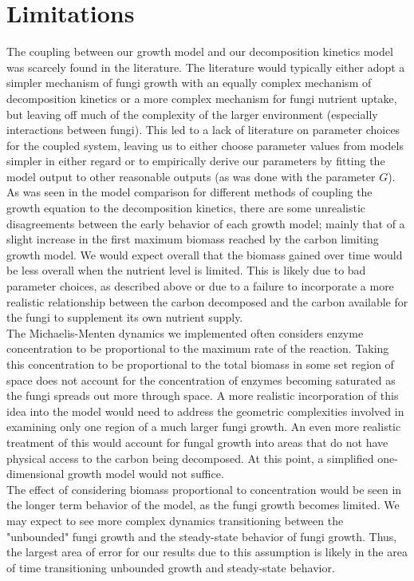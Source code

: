 \documentclass[10pt]{article}
\begin{document}
\section*{Limitations}
The coupling between our growth model and our decomposition kinetics model was scarcely found in the literature. The literature would typically either adopt a simpler mechanism of fungi growth with an equally complex mechanism of decomposition kinetics or a more complex mechanism for fungi nutrient uptake, but leaving off much of the complexity of the larger environment (especially interactions between fungi). This led to a lack of literature on parameter choices for the coupled system, leaving us to either choose parameter values from models simpler in either regard or to empirically derive our parameters by fitting the model output to other reasonable outputs (as was done with the parameter $G$). As was seen in the model comparison for different methods of coupling the growth equation to the decomposition kinetics, there are some unrealistic disagreements between the early behavior of each growth model; mainly that of a slight increase in the first maximum biomass reached by the carbon limiting growth model. We would expect overall that the biomass gained over time would be less overall when the nutrient level is limited. This is likely due to bad parameter choices, as described above or due to a failure to incorporate a more realistic relationship between the carbon decomposed and the carbon available for the fungi to supplement its own nutrient supply. \\
The Michaelis-Menten dynamics we implemented often considers enzyme concentration to be proportional to the maximum rate of the reaction. Taking this concentration to be proportional to the total biomass in some set region of space does not account for the concentration of enzymes becoming saturated as the fungi spreads out more through space. A more realistic incorporation of this idea into the model would need to address the geometric complexities involved in examining only one region of a much larger fungi growth. An even more realistic treatment of this would account for fungal growth into areas that do not have physical access to the carbon being decomposed. At this point, a simplified one-dimensional growth model would not suffice. \\
The effect of considering biomass proportional to concentration would be seen in the longer term behavior of the model, as the fungi growth becomes limited. We may expect to see more complex dynamics transitioning between the "unbounded" fungi growth and the steady-state behavior of fungi growth. Thus, the largest area of error for our results due to this assumption is likely in the area of time transitioning unbounded growth and steady-state behavior. \\
\end{document}
